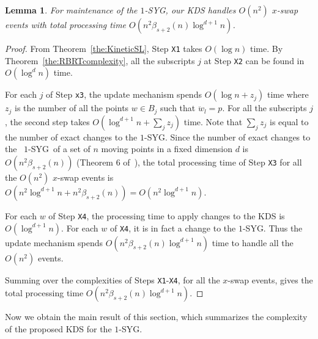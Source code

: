 \documentclass[preprint,12pt]{elsarticle}
\def\1syg{\mbox{$1$-SYG}}
\newtheorem{lemma}{Lemma}[section]
\begin{document}
\begin{lemma}\label{the:Xswap}
For maintenance of the \1syg, our KDS handles $O(n^2)$ $x$-swap events with total processing time $O(n^2\beta_{s+2}(n)\log^{d+1} n)$.
\end{lemma}
\begin{proof} 
From Theorem~\ref{the:KineticSL}, Step \texttt{X1} takes $O(\log n)$ time.  By Theorem~\ref{the:RBRTcomplexity}, all the subscripts $j$ at Step \texttt{X2} can be found in $O(\log^d n)$ time.

For each $j$ of Step \texttt{x3}, the update mechanism spends $O(\log n + z_j)$ time where $z_j$ is the number of all the points $w\in B_j$ such that $\ddot{w}_l=p$. For all the subscripts $j$, the second step takes $O(\log^{d+1} n + \sum_j z_j)$ time. Note that $\sum_j z_j$ is equal to the number of exact changes to the \1syg. Since the number of exact changes to the ~\1syg~of a set of $n$ moving points in a fixed dimension $d$ is $O(n^2\beta_{s+2}(n))$ (Theorem 6 of~\cite{Rahmati2014}), the total processing time of Step \texttt{X3} for all the $O(n^2)$ $x$-swap events is $O(n^2\log^{d+1} n + n^2\beta_{s+2}(n))=O(n^2\log^{d+1} n)$. 

For each $w$ of Step \texttt{X4}, the processing time to apply changes to the KDS is $O(\log^{d+1} n)$. For each $w$ of \texttt{X4}, it is in fact a change to the \1syg. Thus the update mechanism spends $O(n^2\beta_{s+2}(n)\log^{d+1} n)$ time to handle all the $O(n^2)$ events.

Summing over the complexities of Steps \texttt{X1}-\texttt{X4}, for all the $x$-swap events, gives the total processing time  $O(n^2\beta_{s+2}(n)\log^{d+1} n)$.
\end{proof}

Now we obtain the main result of this section, which summarizes the complexity of the proposed KDS for the \1syg.
\end{document}
